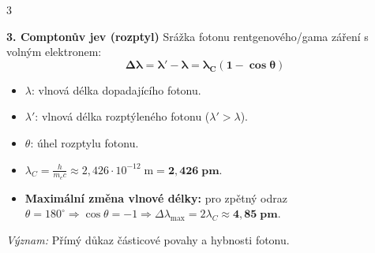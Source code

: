 \documentclass[9pt,a4paper]{article}
\begin{document}
\begin{tcolorbox}[secbox,title=2. KORPUSKULÁRNĚ-VLNOVÝ DUALISMUS, FOTOELEKTRICKÝ JEV A COMPTONŮV ROZPTYL]
\begin{multicols}{3}
\columnbreak

\textbf{3. Comptonův jev (rozptyl)}
Srážka fotonu rentgenového/gama záření s volným elektronem:
\[\mathbf{\Delta\lambda = \lambda' - \lambda = \lambda_C (1 - \cos\theta)}\]
\begin{itemize}
  \item $\lambda$: vlnová délka dopadajícího fotonu.
  \item $\lambda'$: vlnová délka rozptýleného fotonu ($\lambda' > \lambda$).
  \item $\theta$: úhel rozptylu fotonu.
  \item $\lambda_C = \frac{h}{m_e c} \approx 2{,}426 \cdot 10^{-12}\;\text{m} = \mathbf{2{,}426\;\text{pm}}$.
  \item \textbf{Maximální změna vlnové délky:} pro zpětný odraz $\theta = 180^\circ \Rightarrow \cos\theta = -1 \Rightarrow \Delta\lambda_{\max} = 2\lambda_C \approx \mathbf{4{,}85\;\text{pm}}$.
\end{itemize}
\emph{Význam:} Přímý důkaz částicové povahy a hybnosti fotonu.

\end{multicols}
\end{tcolorbox}
\end{document}

